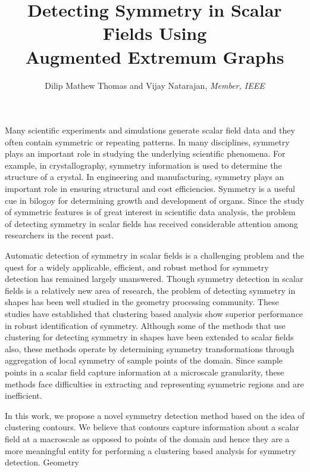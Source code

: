 \documentclass[review,journal]{vgtc}         %
\title{Detecting Symmetry in Scalar Fields Using\\Augmented Extremum Graphs}
\author{Dilip Mathew Thomas and Vijay Natarajan, \textit{Member, IEEE}}
\begin{document}


\maketitle


Many scientific experiments and simulations generate scalar field data and 
they often contain symmetric or repeating patterns. In many disciplines, 
symmetry plays an important role in studying the underlying scientific phenomena. 
For example, in crystallography, symmetry information is used to determine 
the structure of a crystal. In engineering and manufacturing, symmetry plays 
an important role in ensuring structural and cost efficiencies. Symmetry is a 
useful cue in bilogoy for determining growth and development of organs. Since 
the study of symmetric features is of great interest in scientific data 
analysis, the problem of detecting symmetry in scalar fields has received 
considerable attention among researchers in the recent past.

Automatic detection of symmetry in scalar fields is a challenging problem and the quest for a widely applicable, efficient, and robust method for symmetry detection has remained largely unanswered. Though symmetry detection in scalar fields is a relatively new area of research, the problem of detecting symmetry in shapes has been well studied in the geometry processing community. These studies have established that clustering based analysis show superior performance in robust
identification of symmetry. Although some of the methods that use clustering for detecting symmetry in shapes have been extended to scalar fields also, these methods operate by determining symmetry transformations through aggregation of local symmetry of sample points of the domain. Since sample points in a scalar field capture information at a microscale granularity,  these methods face difficulties in extracting and representing symmetric regions and are inefficient.

In this work, we propose a novel symmetry detection method based on the idea of clustering contours. We believe that contours capture information about a scalar field at a macroscale as opposed to points of the domain and hence they are a more meaningful entity for performing a clustering based analysis for symmetry detection. Geometry 
\end{document}
